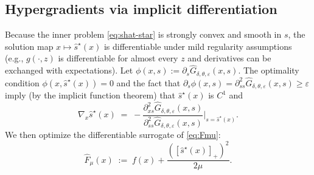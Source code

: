 \documentclass{uai2026} %
\theoremstyle{plain}
\theoremstyle{definition}
\begin{document}
\subsection{Hypergradients via implicit differentiation}
Because the inner problem \eqref{eq:shat-star} is strongly convex and smooth in $s$, the solution map $x\mapsto \widehat s^\star(x)$ is differentiable under mild regularity assumptions (e.g., $g(\cdot,z)$ is differentiable for almost every $z$ and derivatives can be exchanged with expectations).
Let $\phi(x,s):=\partial_s \widehat G_{\delta,\theta,\varepsilon}(x,s)$.
The optimality condition $\phi(x,\widehat s^\star(x))=0$ and the fact that $\partial_s\phi(x,s)=\partial^2_{ss}\widehat G_{\delta,\theta,\varepsilon}(x,s)\ge \varepsilon$ imply (by the implicit function theorem) that $\widehat s^\star(x)$ is $C^1$ and
\begin{equation}
  \nabla_x \widehat s^\star(x)
  \;=\;
  - \frac{\partial^2_{xs}\widehat G_{\delta,\theta,\varepsilon}(x,s)}{\partial^2_{ss}\widehat G_{\delta,\theta,\varepsilon}(x,s)}
  \bigg|_{s=\widehat s^\star(x)}.\label{eq:hypergrad}
\end{equation}
We then optimize the differentiable surrogate of \eqref{eq:Fmu}:
\begin{equation}
  \widehat F_\mu(x)\;:=\; f(x) + \frac{([\widehat s^\star(x)]_+)^2}{2\mu}.\label{eq:Fhat}
\end{equation}
\end{document}
